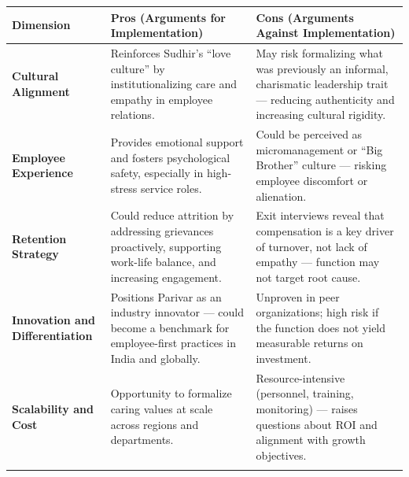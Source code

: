 \documentclass[10pt,a4paper]{book}
\begin{document}
\begin{table}[H]
\centering
\renewcommand{\arraystretch}{1.4}
\begin{tabular}{|p{4.2cm}|p{6cm}|p{6cm}|}
\hline
\rowcolor{gray!30}
\textbf{Dimension} & \textbf{Pros (Arguments for Implementation)} & \textbf{Cons (Arguments Against Implementation)} \\
\hline

\textbf{Cultural Alignment} & 
Reinforces Sudhir’s “love culture” by institutionalizing care and empathy in employee relations. &
May risk formalizing what was previously an informal, charismatic leadership trait — reducing authenticity and increasing cultural rigidity. \\
\hline

\textbf{Employee Experience} &
Provides emotional support and fosters psychological safety, especially in high-stress service roles. &
Could be perceived as micromanagement or “Big Brother” culture — risking employee discomfort or alienation. \\
\hline

\textbf{Retention Strategy} &
Could reduce attrition by addressing grievances proactively, supporting work-life balance, and increasing engagement. &
Exit interviews reveal that compensation is a key driver of turnover, not lack of empathy — function may not target root cause. \\
\hline

\textbf{Innovation and Differentiation} &
Positions Parivar as an industry innovator — could become a benchmark for employee-first practices in India and globally. &
Unproven in peer organizations; high risk if the function does not yield measurable returns on investment. \\
\hline

\textbf{Scalability and Cost} &
Opportunity to formalize caring values at scale across regions and departments. &
Resource-intensive (personnel, training, monitoring) — raises questions about ROI and alignment with growth objectives. \\
\hline

\rowcolor{gray!20}
\multicolumn{3}{|c|}{\textbf{Strategic Recommendations}} \\
\hline


\end{tabular}
\end{table}
\end{document}
